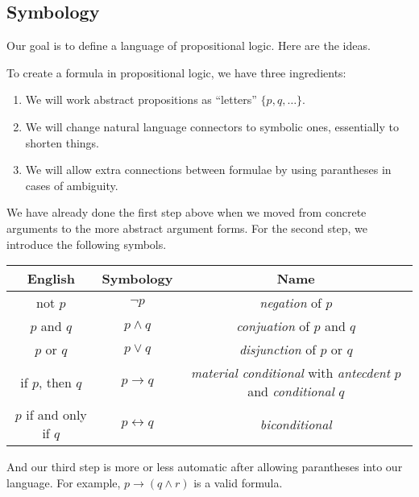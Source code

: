 \subsection{Symbology}
Our goal is to define a language of propositional logic. Here are the ideas.
\begin{idea}
	To create a formula in propositional logic, we have three ingredients:
	\begin{enumerate}
		\item We will work abstract propositions as ``letters'' $\{p,q,\ldots\}$.
		\item We will change natural language connectors to symbolic ones, essentially to shorten things.
		\item We will allow extra connections between formulae by using parantheses in cases of ambiguity.
	\end{enumerate}
\end{idea}
We have already done the first step above when we moved from concrete arguments to the more abstract argument forms. For the second step, we introduce the following symbols.
\begin{center}
	\begin{tabular}{c|c|c}
		English & Symbology & Name \\\hline
		not $p$ & $\lnot p$ & \textit{negation} of $p$ \\
		$p$ and $q$ & $p\land q$ & \textit{conjuation} of $p$ and $q$ \\
		$p$ or $q$ & $p\lor q$ & \textit{disjunction} of $p$ or $q$ \\
		if $p$, then $q$ & $p\to q$ & \textit{material conditional} with \textit{antecdent} $p$ and \textit{conditional} $q$ \\
		$p$ if and only if $q$ & $p\leftrightarrow q$ & \textit{biconditional}
	\end{tabular}
\end{center}
And our third step is more or less automatic after allowing parantheses into our language. For example, $p\to(q\land r)$ is a valid formula.

